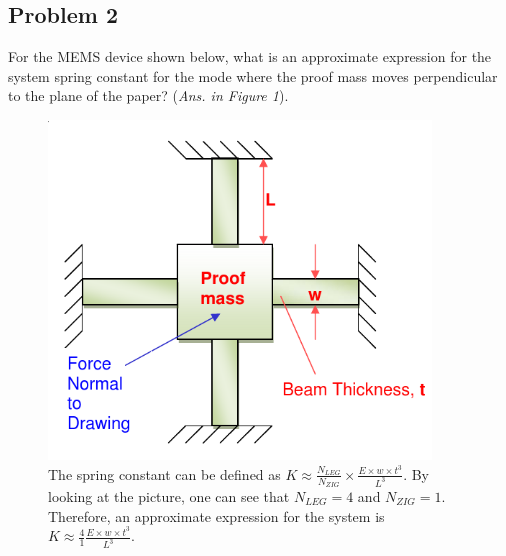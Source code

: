 \documentclass{article}
\begin{document}
\subsection*{Problem 2}
For the MEMS device shown below, what is an approximate expression for the
   system spring constant for the mode where the proof mass moves perpendicular to
   the plane of the paper? (\emph{Ans. in Figure 1}).
   \begin{figure}[h]
	   \centering
	   \includegraphics[width=4in]{hw2_mems}
	   \caption{ The spring constant can be defined as 
		   $ K \approx \frac{N_{LEG}}{N_{ZIG}} \times \frac{E \times w \times t^3}{L^3} $. 
	   By looking at the picture, one can see that $N_{LEG} = 4$ and $N_{ZIG} = 1$. Therefore, an approximate expression for the system is\\ $K \approx \frac{4}{1} \frac{E \times w \times t^3}{L^3}$.}
	   \end{figure}



\label{end}
\end{document}
